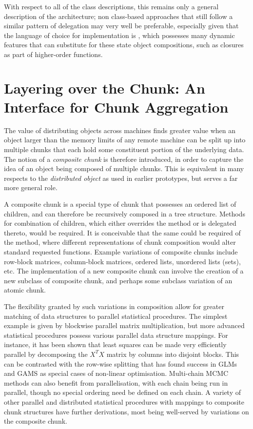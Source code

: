 \documentclass[10pt, a4paper]{article}
\begin{document}

With respect to all of the class descriptions, this remains only a general description of the architecture; non class-based approaches that still follow a similar pattern of delegation may very well be preferable, especially given that the language of choice for implementation is \R{}, which possesses many dynamic features that can substitute for these state object compositions, such as closures as part of higher-order functions.

\section{Layering over the Chunk: An Interface for Chunk Aggregation}

The value of distributing objects across machines finds greater value when an object larger than the memory limits of any remote machine can be split up into multiple chunks that each hold some constituent portion of the underlying data.
The notion of a \textit{composite chunk} is therefore introduced, in order to capture the idea of an object being composed of multiple chunks.
This is equivalent in many respects to the \textit{distributed object} as used in earlier prototypes, but serves a far more general role.

A composite chunk is a special type of chunk that possesses an ordered list of children, and can therefore be recursively composed in a tree structure.
Methods for combination of children, which either overrides the  method or is delegated thereto, would be required.
It is conceivable that the same could be required of the  method, where different representations of chunk composition would alter standard requested functions.
Example variations of composite chunks include row-block matrices, column-block matrices, ordered lists, unordered lists (sets), etc.
The implementation of a new composite chunk can involve the creation of a new subclass of composite chunk, and perhaps some subclass variation of an atomic chunk.

The flexibility granted by such variations in composition allow for greater matching of data structures to parallel statistical procedures.
The simplest example is given by blockwise parallel matrix multiplication, but more advanced statistical procedures possess various parallel data structure mappings.
For instance, it has been shown that least squares can be made very efficiently parallel by decomposing the $X^TX$ matrix by columns into disjoint blocks\cite{renaut1998parallel}.
This can be contrasted with the row-wise splitting that has found success in GLMs and GAMS as special cases of non-linear optimisation\cite{suri2002parallel}.
Multi-chain MCMC methods can also benefit from parallelisation, with each chain being run in parallel, though no special ordering need be defined on each chain\cite{strid2010parmcmc}.
A variety of other parallel and distributed statistical procedures with mappings to composite chunk structures have further derivations, most being well-served by variations on the composite chunk\cite{guo2012parallel}.
\end{document}
